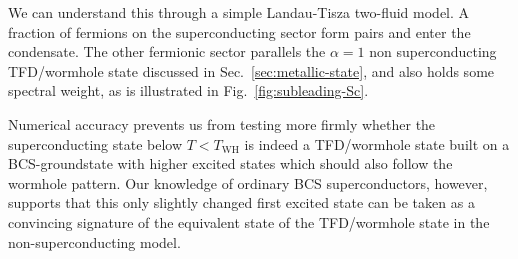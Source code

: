 We can understand this through a simple Landau-Tisza two-fluid model. A fraction of fermions on the superconducting sector form pairs and enter the condensate. The other fermionic sector parallels the $\alpha=1$ non superconducting TFD/wormhole state discussed in Sec.~\ref{sec:metallic-state}, and also holds some spectral weight, as is illustrated in Fig.~\ref{fig:subleading-Sc}.

Numerical accuracy prevents us from testing more firmly whether the superconducting state below $T<T_{\text{WH}}$ is indeed a TFD/wormhole state built on a BCS-groundstate with higher excited states which should also follow the wormhole pattern. Our knowledge of ordinary BCS superconductors, however, supports that this only slightly changed first excited state can be taken as a convincing signature of the equivalent state of the TFD/wormhole state in the non-superconducting model. 



